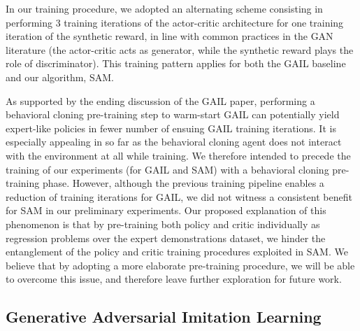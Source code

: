 In our training procedure, we adopted an alternating scheme consisting in
performing 3 training iterations of the actor-critic architecture for one
training iteration of the synthetic reward, in line with common practices in
the GAN literature (the actor-critic acts as generator, while the synthetic
reward plays the role of discriminator).
This training pattern applies for both the GAIL baseline and our algorithm,
SAM.

As supported by the ending discussion of the GAIL paper, performing a
behavioral cloning \cite{Pomerleau1989-nh, Pomerleau1990-lm}
pre-training step to warm-start GAIL
can potentially yield expert-like policies
in fewer number of ensuing GAIL training iterations.
It is especially appealing in so far as the behavioral cloning agent
does not interact with the environment at all while training.
We therefore intended to precede the training of our experiments
(for GAIL and SAM) with a behavioral cloning pre-training phase.
However, although the previous training pipeline enables a reduction of
training iterations for GAIL, we did not witness a consistent benefit for
SAM in our preliminary experiments.
Our proposed explanation of this phenomenon is that by pre-training both policy
and critic individually as regression problems over the expert demonstrations
dataset, we hinder the entanglement of the policy and critic training
procedures exploited in SAM.
We believe that by adopting a more elaborate pre-training procedure, we will be
able to overcome this issue, and therefore leave further exploration for future
work.

\subsection{Generative Adversarial Imitation Learning}


